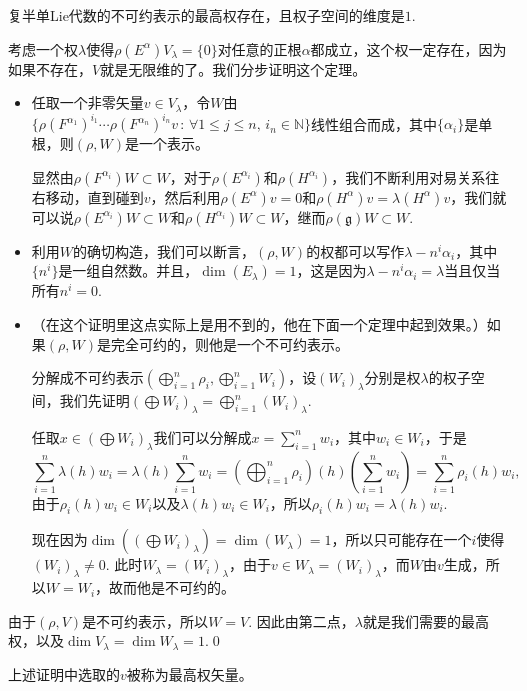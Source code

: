 \documentclass[10pt]{article}
\newcommand{\lag}{{\mathfrak{g}}}
\begin{document}
\theo 复半单Lie代数的不可约表示的最高权存在，且权子空间的维度是$1$.

\proof 考虑一个权$\lambda$使得$\rho(E^\alpha)V_\lambda=\{0\}$对任意的正根$\alpha$都成立，这个权一定存在，因为如果不存在，$V$就是无限维的了。我们分步证明这个定理。

\begin{itemize}
\item 任取一个非零矢量$v\in V_\lambda$，令$W$由$\bigl\{\rho(F^{\alpha_1})^{i_1}\cdots \rho(F^{\alpha_n})^{i_n}v\,:\, \forall 1\leq j\leq n,\, i_n\in \mathbb{N}\bigr\}$线性组合而成，其中$\{\alpha_i\}$是单根，则$(\rho,W)$是一个表示。

显然由$\rho(F^{\alpha_i})W\subset W$，对于$\rho(E^{\alpha_i})$和$\rho(H^{\alpha_i})$，我们不断利用对易关系往右移动，直到碰到$v$，然后利用$\rho(E^\alpha)v=0$和$\rho(H^\alpha)v=\lambda(H^\alpha)v$，我们就可以说$\rho(E^{\alpha_i})W\subset W$和$\rho(H^{\alpha_i})W\subset W$，继而$\rho(\lag)W\subset W$.

\item 利用$W$的确切构造，我们可以断言，$(\rho,W)$的权都可以写作$\lambda-n^i\alpha_i$，其中$\{n^i\}$是一组自然数。并且，$\dim(E_\lambda)=1$，这是因为$\lambda-n^i\alpha_i=\lambda$当且仅当所有$n^i=0$.

\item （在这个证明里这点实际上是用不到的，他在下面一个定理中起到效果。）如果$(\rho,W)$是完全可约的，则他是一个不可约表示。

分解成不可约表示$(\bigoplus_{i=1}^n\rho_i,\bigoplus_{i=1}^n W_i)$，设$(W_i)_\lambda$分别是权$\lambda$的权子空间，我们先证明$(\bigoplus W_i)_\lambda=\bigoplus_{i=1}^n (W_i)_\lambda$.

任取$x\in (\bigoplus W_i)_\lambda$我们可以分解成$x=\sum_{i=1}^nw_i$，其中$w_i\in W_i$，于是
\[
	\sum_{i=1}^n\lambda(h)w_i=\lambda(h)\sum_{i=1}^nw_i=\left(\bigoplus_{i=1}^n\rho_i\right)(h)\left(\sum_{i=1}^nw_i\right)=\sum_{i=1}^n\rho_i(h)w_i,
\]
由于$\rho_i(h)w_i\in W_i$以及$\lambda(h)w_i\in W_i$，所以$\rho_i(h)w_i=\lambda(h)w_i$. 

现在因为$\dim((\bigoplus W_i)_\lambda)=\dim(W_\lambda)=1$，所以只可能存在一个$i$使得$(W_i)_\lambda\neq 0$. 此时$W_\lambda=(W_i)_\lambda$，由于$v\in W_\lambda=(W_i)_\lambda$，而$W$由$v$生成，所以$W=W_i$，故而他是不可约的。
\end{itemize}

由于$(\rho,V)$是不可约表示，所以$W=V$. 因此由第二点，$\lambda$就是我们需要的最高权，以及$\dim V_\lambda=\dim W_\lambda=1$.\qed 

上述证明中选取的$v$被称为最高权矢量。
\end{document}

